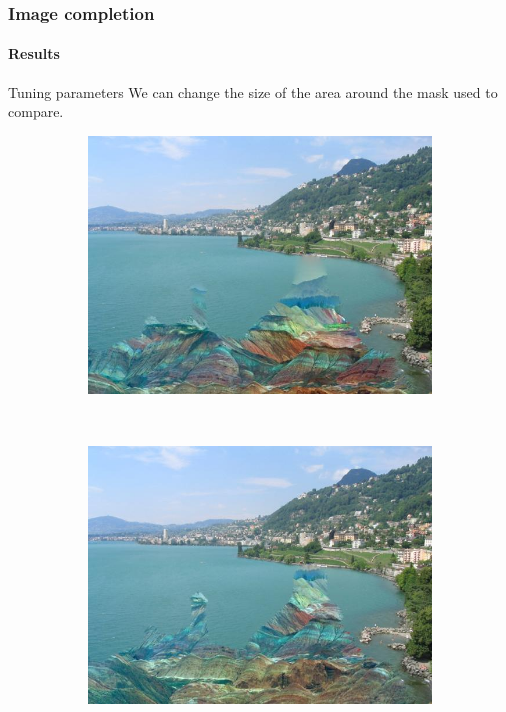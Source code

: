 \documentclass[11pt]{beamer}
\begin{document}
\begin{frame}
\frametitle{Image completion}
\framesubtitle{Results}
\begin{block}{Tuning parameters}
We can change the size of the area around the mask used to compare.
\end{block}

\begin{figure}
    \centering
    \begin{subfigure}[b]{0.45\textwidth}
        \includegraphics[width=\textwidth]{IMG_0681_paisajes-pintura-2_20}

    \end{subfigure}
    ~ 
        \begin{subfigure}[b]{0.45\textwidth}
        \includegraphics[width=\textwidth]{IMG_0681_paisajes-pintura-2_100}

    \end{subfigure}



\end{figure}
\end{frame}
\end{document}
